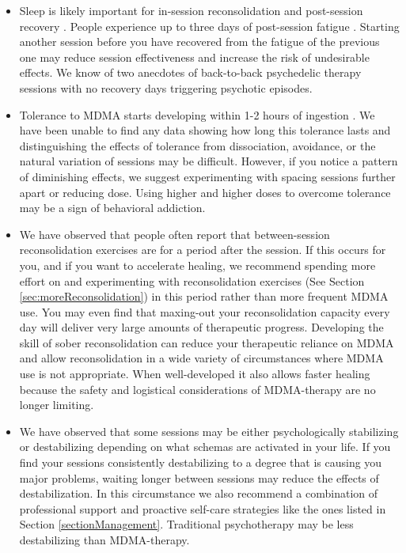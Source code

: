 \documentclass[12pt,letterpaper]{book}
\begin{document}
\begin{itemize}
    \item Sleep is likely important for in-session reconsolidation and post-session recovery \cite{simon2020sleep}. People experience up to three days of post-session fatigue \cite{liechtiGender}. Starting another session before you have recovered from the fatigue of the previous one may reduce session effectiveness and increase the risk of undesirable effects. We know of two anecdotes of back-to-back psychedelic therapy sessions with no recovery days triggering psychotic episodes.
    \item Tolerance to MDMA starts developing within 1-2 hours of ingestion \cite{farreTolerance,parrottTolerance}. We have been unable to find any data showing how long this tolerance lasts and distinguishing the effects of tolerance from dissociation, avoidance, or the natural variation of sessions may be difficult. However, if you notice a pattern of diminishing effects, we suggest experimenting with spacing sessions further apart or reducing dose. Using higher and higher doses to overcome tolerance may be a sign of behavioral addiction.
    \item We have observed that people often report that between-session reconsolidation exercises are for a period after the session. If this occurs for you, and if you want to accelerate healing, we recommend spending more effort on and experimenting with reconsolidation exercises (See Section \ref{sec:moreReconsolidation}) in this period rather than more frequent MDMA use. You may even find that maxing-out your reconsolidation capacity every day will deliver very large amounts of therapeutic progress. Developing the skill of sober reconsolidation can reduce your therapeutic reliance on MDMA and allow reconsolidation in a wide variety of circumstances where MDMA use is not appropriate. When well-developed it also allows faster healing because the safety and logistical considerations of MDMA-therapy are no longer limiting.
    \item We have observed that some sessions may be either psychologically stabilizing or destabilizing depending on what schemas are activated in your life. If you find your sessions consistently destabilizing to a degree that is causing you major problems, waiting longer between sessions may reduce the effects of destabilization. In this circumstance we also recommend a combination of professional support and proactive self-care strategies like the ones listed in Section \ref{sectionManagement}. Traditional psychotherapy may be less destabilizing than MDMA-therapy.

\end{itemize}
\end{document}
